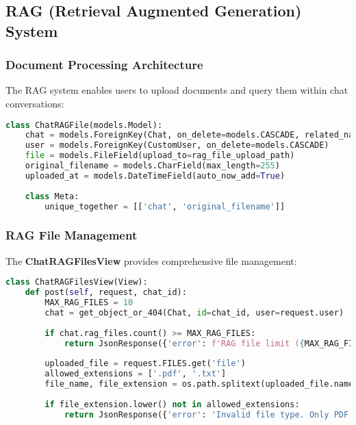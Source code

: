 \documentclass[12pt,a4paper]{article}
\begin{document}
\subsection{RAG (Retrieval Augmented Generation) System}

\subsubsection{Document Processing Architecture}

The RAG system enables users to upload documents and query them within chat conversations:

\begin{lstlisting}[language=Python, caption=RAG File Model]
class ChatRAGFile(models.Model):
    chat = models.ForeignKey(Chat, on_delete=models.CASCADE, related_name='rag_files')
    user = models.ForeignKey(CustomUser, on_delete=models.CASCADE)
    file = models.FileField(upload_to=rag_file_upload_path)
    original_filename = models.CharField(max_length=255)
    uploaded_at = models.DateTimeField(auto_now_add=True)
    
    class Meta:
        unique_together = [['chat', 'original_filename']]
\end{lstlisting}

\subsubsection{RAG File Management}

The \textbf{ChatRAGFilesView} provides comprehensive file management:

\begin{lstlisting}[language=Python, caption=RAG File Operations]
class ChatRAGFilesView(View):
    def post(self, request, chat_id):
        MAX_RAG_FILES = 10
        chat = get_object_or_404(Chat, id=chat_id, user=request.user)
        
        if chat.rag_files.count() >= MAX_RAG_FILES:
            return JsonResponse({'error': f'RAG file limit ({MAX_RAG_FILES}) reached.'}, status=400)
        
        uploaded_file = request.FILES.get('file')
        allowed_extensions = ['.pdf', '.txt']
        file_name, file_extension = os.path.splitext(uploaded_file.name)
        
        if file_extension.lower() not in allowed_extensions:
            return JsonResponse({'error': 'Invalid file type. Only PDF and TXT are allowed.'}, status=400)
\end{lstlisting}
\end{document}
